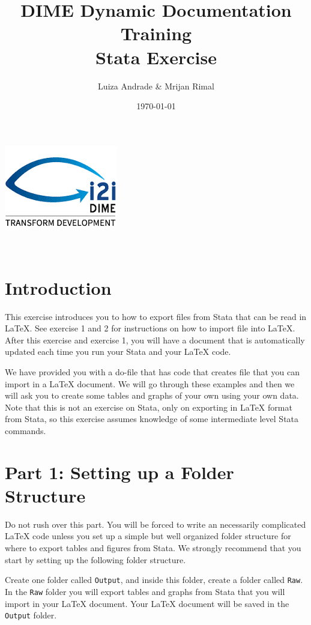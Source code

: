 \documentclass[]{article}
\title{DIME Dynamic Documentation Training \\ Stata Exercise}
\author{Luiza Andrade \& Mrijan Rimal}
\date{\today}
\begin{document}
\makeatletter
\begin{titlepage}
	\begin{center}
		\includegraphics[width=0.3\linewidth]{img/i2i.png}\\[10ex]
		{\LARGE \bfseries  \@title }\\[2ex] 
		{\Large  \@author}\\[20ex] 
		{\large \@date}
	\end{center}
\end{titlepage}
\makeatother

\section*{Introduction}
This exercise introduces you to how to export files from Stata that can be read in {\LaTeX}. See exercise 1 and 2 for instructions on how to import file into {\LaTeX}. After this exercise and exercise 1, you will have a document that is automatically updated each time you run your Stata and your {\LaTeX} code.

We have provided you with a do-file that has code that creates file that you can import in a {\LaTeX} document. We will go through these examples and then we will ask you to create some tables and graphs of your own using your own data. Note that this is not an exercise on Stata, only on exporting in {\LaTeX} format from Stata, so this exercise assumes knowledge of some intermediate level Stata commands.

\section*{Part 1: Setting up a Folder Structure}
Do not rush over this part. You will be forced to write an necessarily complicated {\LaTeX} code unless you set up a simple but well organized folder structure for where to export tables and figures from Stata. We strongly recommend that you start by setting up the following folder structure. 

Create one folder called \texttt{Output}, and inside this folder, create a folder called \texttt{Raw}. In the \texttt{Raw} folder you will export tables and graphs from Stata that you will import in your {\LaTeX} document. Your {\LaTeX} document will be saved in the \texttt{Output} folder.
\end{document}
